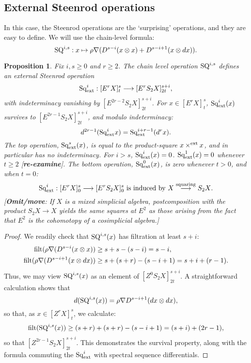 \documentclass[11pt]{amsart}
\theoremstyle{plain}
\newtheorem{prop}[thm]{Proposition}
\theoremstyle{definition}
\renewcommand{\to}{\longrightarrow}
\theoremstyle{plain}
\newcommand{\Nabla}{\nabla}
\newcommand{\Sq}{\mathrm{Sq}}
\newcommand{\E}[5]{[E^{#1}_{#2}#3]^{#4}_{#5}}
\newcommand{\EZ}[5]{[Z^{#1}_{#2}#3]^{#4}_{#5}}
\newcommand{\filt}{\textup{filt}}
\begin{document}
\begin{second quadrant homotopy}
\subsection{External Steenrod operations}
In this case, the Steenrod operations are the `surprising' operations, and they are easy to define. We will use the chain-level formula:
\[\textup{SQ}^{i,s}:x\mapsto \rho\Nabla (D^{s-i}(x\otimes x)+D^{s-i+1}(x\otimes dx)).\]
\begin{prop}
Fix $i,s\geq0$ and $r\geq2$. The chain level operation $\textup{SQ}^{i,s}$ defines an \emph{external Steenrod operation} \[\Sq^i_\textup{ext}:\E{r}{}{X}{s}{t}\to \E{r}{}{S_2X}{s+i}{2t},\] with indeterminacy vanishing by $\E{2r-2}{}{S_2X}{s+i}{2t}$. For $x\in \E{r}{}{X}{s}{t}$, $\Sq^i_\textup{ext}(x)$ survives to $\E{2r-1}{}{S_2X}{s+i}{2t}$, and modulo indeterminacy: \[d^{2r-1}(\Sq^i_\textup{ext}x)=\Sq^{i+r-1}_\textup{ext}(d^rx).\]
 The top operation, $\Sq^s_\textup{ext}(x)$, is equal to the product-square $x\times^\textup{ext} x$, and in particular has no indeterminacy. For $i>s$, $\Sq^i_\textup{ext}(x)=0$. $\Sq^1_\textup{ext}(x)=0$ whenever $t\geq2$ [\textbf{re-examine}]. The bottom operation, $\Sq^0_\textup{ext}(x)$, is zero whenever $t>0$, and when $t=0$:
\[\Sq^i_\textup{ext}:\E{r}{}{X}{s}{0}\to \E{r}{}{S_2X}{s}{0}\textup{ is induced by $X\overset{\textup{squaring}}{\to}S_2X$}.\]
 [\textbf{Omit/move}:  If $X$ is a mixed simplicial algebra, postcomposition with the product $S_2X\to X$ yields the same squares at $E^2$ as those arising from the fact that $E^2$ is the cohomotopy of a cosimplicial algebra.]
\end{prop}
\begin{proof}
We readily check that $\textup{SQ}^{i,s}(x)$ has filtration at least $s+i$:
\begin{align*}
\filt(\rho\Nabla (D^{s-i}(x\otimes x))&\geq s+s-(s-i)=s-i,\\\filt(\rho\Nabla (D^{s-i+1}(x\otimes dx))&\geq s+(s+r)-(s-i+1)=s+i+(r-1).
\end{align*}
Thus, we may view $\textup{SQ}^{i,s}(x)$ as an element of $\EZ{0}{}{S_2X}{s+i}{2t}$. 
A straightforward calculation shows that \[d(\textup{SQ}^{i,s}(x))=\rho\Nabla D^{s-i+1}(dx\otimes dx),\] so that, as $x\in \EZ{r}{}{X}{s}{t}$, we calculate:
\[\filt(\textup{SQ}^{i,s}(x))\geq (s+r)+(s+r)-(s-i+1)=(s+i)+(2r-1),\]
so that $\EZ{2r-1}{}{S_2X}{s+i}{2t}$. This demonstrates the survival property, along with the formula commuting the $\Sq^i_\textup{ext}$ with spectral sequence differentials.


\end{proof}
\end{second quadrant homotopy}
\end{document}

